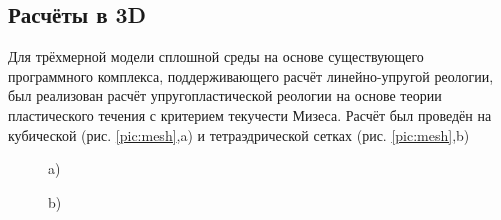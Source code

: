 \subsection{Расчёты в 3D}
Для трёхмерной модели сплошной среды на основе существующего программного комплекса, поддерживающего расчёт  линейно-упругой реологии, был реализован расчёт упругопластической реологии на основе теории пластического течения с критерием текучести Мизеса. Расчёт был проведён на кубической (рис. \ref{pic:mesh},a) и тетраэдрической сетках (рис. \ref{pic:mesh},b)
\begin{figure}
\begin{minipage}{0.8\linewidth}
 a)\\
\end{minipage}
\vfill
\begin{minipage}{0.8\linewidth}
 b)\\

\end{minipage}
\end{figure}
